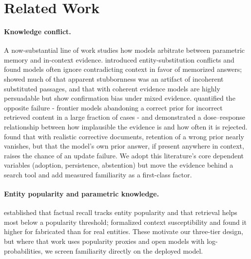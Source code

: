 \documentclass[11pt]{article}
\begin{document}
\section{Related Work}

\paragraph{Knowledge conflict.}
A now-substantial line of work \citep[surveyed by][]{xu2024knowledge} studies how models arbitrate
between parametric memory and
in-context evidence. \citet{longpre2021entity} introduced entity-substitution conflicts and found
models often ignore contradicting context in favor of memorized answers; \citet{xie2024adaptive}
showed much of that apparent stubbornness was an artifact of incoherent substituted passages, and
that with coherent evidence models are highly persuadable but show confirmation bias under mixed
evidence. \citet{wu2024clasheval} quantified the opposite failure - frontier models abandoning a
correct prior for incorrect retrieved content in a large fraction of cases - and demonstrated a
dose--response relationship between how implausible the evidence is and how often it is rejected.
\citet{kortukov2024studying} found that with realistic corrective documents, retention of a wrong
prior nearly vanishes, but that the model's own prior answer, if present anywhere in context,
raises the chance of an update failure. We adopt this literature's core dependent
variables (adoption, persistence, abstention) but move the evidence behind a search tool and add
measured familiarity as a first-class factor.

\paragraph{Entity popularity and parametric knowledge.}
\citet{mallen2023trust} established that factual recall tracks entity popularity and that retrieval
helps most below a popularity threshold; \citet{du2024context} formalized context susceptibility
and found it higher for fabricated than for real entities. These motivate our three-tier design,
but where that work uses popularity proxies and open models with log-probabilities, we screen
familiarity directly on the deployed model.
\end{document}
